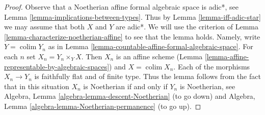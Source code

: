 \documentclass{stacks-project}
\theoremstyle{plain}
\theoremstyle{definition}
\theoremstyle{remark}
\numberwithin{equation}{subsection}
\def\colim{\mathop{\mathrm{colim}}\nolimits}
\begin{document}
\begin{proof}
Observe that a Noetherian affine formal algebraic space is adic*, see
Lemma \ref{lemma-implications-between-types}. Thus by
Lemma \ref{lemma-iff-adic-star} we may assume that both $X$ and $Y$
are adic*. We will use the criterion of
Lemma \ref{lemma-characterize-noetherian-affine}
to see that the lemma holds. Namely, write $Y = \colim Y_n$
as in Lemma \ref{lemma-countable-affine-formal-algebraic-space}.
For each $n$ set $X_n = Y_n \times_Y X$. Then $X_n$ is an
affine scheme (Lemma \ref{lemma-affine-representable-by-algebraic-spaces})
and $X = \colim X_n$. Each of the morphisms $X_n \to Y_n$ is
faithfully flat and of finite type. Thus the lemma follows from the
fact that in this situation $X_n$ is Noetherian if and only if $Y_n$
is Noetherian, see
Algebra, Lemma \ref{algebra-lemma-descent-Noetherian} (to go down)
and
Algebra, Lemma \ref{algebra-lemma-Noetherian-permanence} (to go up).
\end{proof}
\end{document}
